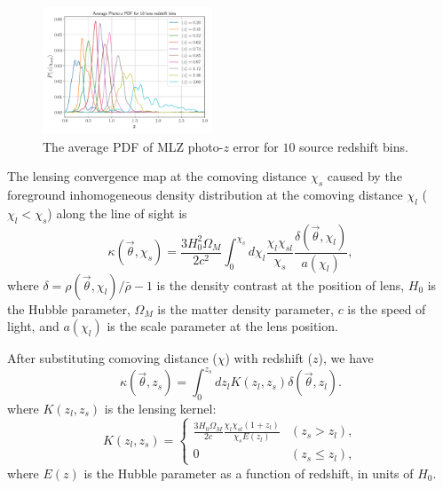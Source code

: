 \begin{figure}
 \centering
 \includegraphics[width=0.45\textwidth]{mlz-poz.pdf}
 \caption{The average PDF of MLZ photo-$z$ error for $10$ source redshift bins.
        }\label{fig_pdfpz}
\end{figure}

The lensing convergence map at the comoving distance $\chi_s$ caused by the
foreground inhomogeneous density distribution at the comoving distance $\chi_l$
($\chi_l< \chi_s$) along the line of sight is
\begin{equation}
\kappa(\vec{\theta},\chi_s)=\frac{3H_0^2\Omega_M}{2 c^2} \int_0^{\chi_s} d\chi_l \frac{\chi_l \chi_{sl}}{\chi_s}
\frac{\delta(\vec{\theta},\chi_l)}{a(\chi_l)},
\end{equation}
where $\delta=\rho(\vec{\theta},\chi_l)/\bar{\rho}-1$ is the density contrast
at the position of lens, $H_0$ is the Hubble parameter, $\Omega_M$ is the
matter density parameter, $c$ is the speed of light, and $a(\chi_l)$ is the
scale parameter at the lens position.

After substituting comoving distance ($\chi$) with redshift ($z$), we have
\begin{equation}\label{eq-delta2kappa}
\kappa(\vec{\theta},z_s)=\int_0^{z_s} dz_l K(z_l,z_s)\delta(\vec{\theta},z_l).
\end{equation}
where $K(z_l,z_s)$ is the lensing kernel:
\begin{equation}
K(z_l,z_s) =
\begin{cases}
\frac{3H_0\Omega_M}{2 c} \frac{\chi_l \chi_{sl} (1+z_l)}{\chi_{s} E\left(z_l\right)} & (z_s>z_l),\\
0&(z_s \leq z_l),
\end{cases}
\end{equation}
where $E(z)$ is the Hubble parameter as a function of redshift, in units of $H_0$.

